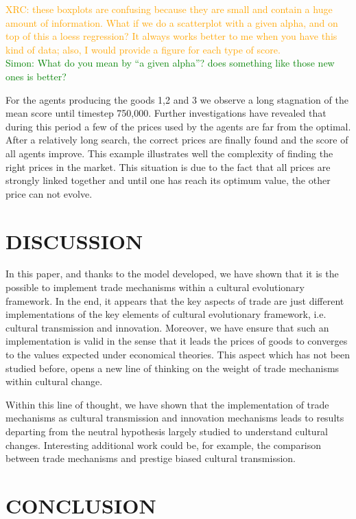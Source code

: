 \documentclass{wscpaperproc}
\newcommand{\memo}[2]{\textcolor{#1}{#2}}
\newcommand{\simon}[1]{\memo{green}{Simon: #1\\}}
\newcommand{\xrc}[1]{\memo{orange}{XRC: #1\\}}
\begin{document}
\xrc{these boxplots are confusing because they are small and contain a huge amount of information. What if we do a scatterplot with a given alpha, and on top of this a loess regression? It always works better to me when you have this kind of data; also, I would provide a figure for each type of score.}
\simon{What do you mean by ``a given alpha''? does something like those new ones is better?}

For the agents producing the goods 1,2 and 3 we observe a long stagnation of the mean score until timestep 750,000. Further investigations have revealed that during this period a few of the prices used by the agents are far from the optimal. After a relatively long search, the correct prices are finally found and the score of all agents improve. This example illustrates well the complexity of finding the right prices in the market. This situation is due to the fact that all prices are strongly linked together and until one has reach its optimum value, the other price can not evolve. 


\section{DISCUSSION}

In this paper, and thanks to the model developed, we have shown that it is the possible to implement trade mechanisms within a cultural evolutionary framework. In the end, it appears that the key aspects of trade are just different implementations of the key elements of cultural evolutionary framework, i.e. cultural transmission and innovation. Moreover, we have ensure that such an implementation is valid in the sense that it leads the prices of goods to converges to the values expected under economical theories. This aspect which has not been studied before, opens a new line of thinking on the weight of trade mechanisms within cultural change.

Within this line of thought, we have shown that the implementation of trade mechanisms as cultural transmission and innovation mechanisms leads to results departing from the neutral hypothesis largely studied to understand cultural changes. Interesting additional work could be, for example, the comparison between trade mechanisms and prestige biased cultural transmission.




\section{CONCLUSION}
\end{document}
